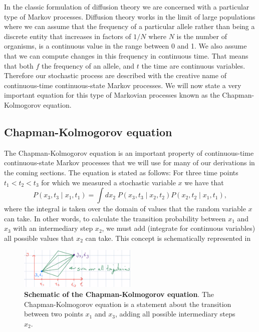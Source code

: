 In the classic formulation of diffusion theory we are concerned with a
particular type of Markov processes. Diffusion theory works in the limit of
large populations where we can assume that the frequency of a particular allele
rather than being a discrete entity that increases in factors of $1 / N$ where
$N$ is the number of organisms, is a continuous value in the range between 0
and 1. We also assume that we can compute changes in this frequency in
continuous time. That means that both $f$ the frequency of an allele, and $t$
the time are continuous variables. Therefore our stochastic process are
described with the creative name of continuous-time continuous-state Markov
processes. We will now state a very important equation for this type of
Markovian processes known as the Chapman-Kolmogorov equation.

\subsection{Chapman-Kolmogorov equation}

The Chapman-Kolmogorov equation is an important property of continuous-time
continuous-state Markov processes that we will use for many of our derivations
in the coming sections. The equation is stated as follows: For three time points
$t_1 < t_2 < t_3$ for which we measured a stochastic variable $x$ we have that
\begin{equation}
  P(x_3, t_3 \mid x_1, t_1) = \int dx_2\; P(x_3, t_3 \mid x_2, t_2)
                                          P(x_2, t_2 \mid x_1, t_1),
\end{equation}
where the integral is taken over the domain of values that the random variable
$x$ can take. In other words, to calculate the transition probability between
$x_1$ and $x_3$ with an intermediary step $x_2$, we must add (integrate for
continuous variables) all possible values that $x_2$ can take. This concept is
schematically represented in 

\begin{figure}[h!]
	\centering \includegraphics[width=0.5\textwidth]
  {./fig/chapter_prob/01_00003.png}
	\caption{\textbf{Schematic of the Chapman-Kolmogorov equation}. The
  Chapman-Kolmogorov equation is a statement about the transition between two
  points $x_1$ and $x_3$, adding all possible intermediary steps $x_2$.}
  \label{fig01_00003}
\end{figure}

